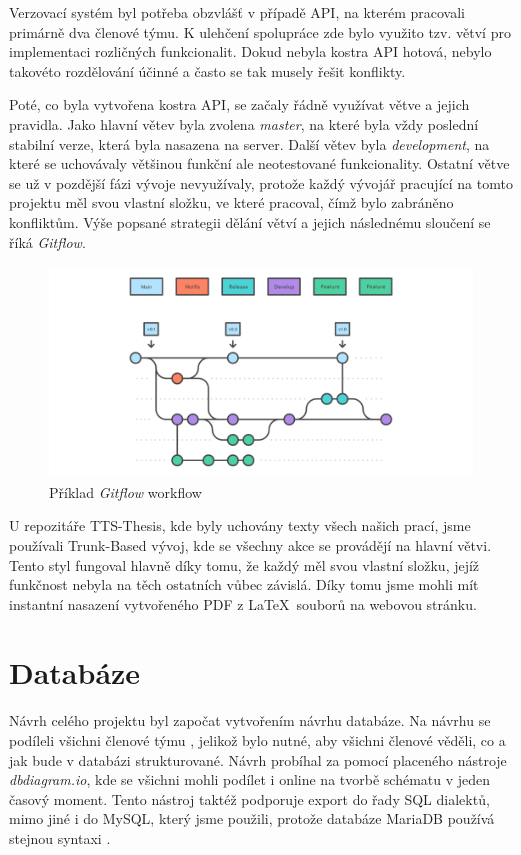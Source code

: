 Verzovací systém byl potřeba obzvlášť v případě API, na kterém pracovali primárně dva členové týmu. K ulehčení spolupráce zde bylo využito tzv. větví pro implementaci rozličných funkcionalit. Dokud nebyla kostra API hotová, nebylo takovéto rozdělování účinné a často se tak musely řešit konflikty.

Poté, co byla vytvořena kostra API, se začaly řádně využívat větve a jejich pravidla. Jako hlavní větev byla zvolena \textit{master}, na které byla vždy poslední stabilní verze, která byla nasazena na server. Další větev byla \textit{development}, na které se uchovávaly většinou funkční ale neotestované funkcionality. Ostatní větve se už v pozdější fázi vývoje nevyužívaly, protože každý vývojář pracující na tomto projektu měl svou vlastní složku, ve které pracoval, čímž bylo zabráněno konfliktům. Výše popsané strategii dělání větví a jejich následnému sloučení se říká \textit{Gitflow}.

\begin{figure}[H]
    \centering
    \includegraphics[width=\textwidth]{figures/impl/git-flow.png}
    \caption{Příklad \textit{Gitflow} workflow}
    \label{fig:gitflow}
\end{figure}

U repozitáře TTS-Thesis, kde byly uchovány texty všech našich prací, jsme používali Trunk-Based vývoj, kde se všechny akce se provádějí na hlavní větvi. Tento styl fungoval hlavně díky tomu, že každý měl svou vlastní složku, jejíž funkčnost nebyla na těch ostatních vůbec závislá. Díky tomu jsme mohli mít instantní nasazení vytvořeného PDF z \LaTeX ~souborů na webovou stránku.


\section{Databáze}\label{sec:database}
Návrh celého projektu byl započat vytvořením návrhu databáze. Na návrhu se podíleli všichni členové týmu , jelikož bylo nutné, aby všichni členové věděli, co a jak bude v databázi strukturované. Návrh probíhal za pomocí placeného nástroje \textit{dbdiagram.io}, kde se  všichni mohli podílet i online na tvorbě schématu v jeden časový moment. Tento nástroj taktéž podporuje export do řady SQL dialektů, mimo jiné i do MySQL, který jsme použili, protože databáze MariaDB používá stejnou syntaxi .


